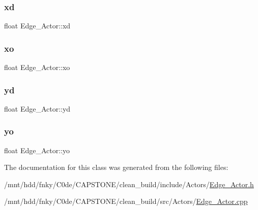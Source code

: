 \mbox{\label{classEdge__Actor_a199cf64246d58f774a44cba9d9beb234}} 
\subsubsection{\texorpdfstring{xd}{xd}}
{\footnotesize\ttfamily float Edge\+\_\+\+Actor\+::xd\hspace{0.3cm}{\ttfamily [private]}}

\mbox{\label{classEdge__Actor_a17823723d52282b169bca1883f19aa99}} 
\subsubsection{\texorpdfstring{xo}{xo}}
{\footnotesize\ttfamily float Edge\+\_\+\+Actor\+::xo\hspace{0.3cm}{\ttfamily [private]}}

\mbox{\label{classEdge__Actor_a0009e7f76e522ae46cc88279f8967205}} 
\subsubsection{\texorpdfstring{yd}{yd}}
{\footnotesize\ttfamily float Edge\+\_\+\+Actor\+::yd\hspace{0.3cm}{\ttfamily [private]}}

\mbox{\label{classEdge__Actor_a74d62448006433516df25448ec8f3cb4}} 
\subsubsection{\texorpdfstring{yo}{yo}}
{\footnotesize\ttfamily float Edge\+\_\+\+Actor\+::yo\hspace{0.3cm}{\ttfamily [private]}}



The documentation for this class was generated from the following files\+:\begin{DoxyCompactItemize}
\item 
/mnt/hdd/fnky/\+C0de/\+C\+A\+P\+S\+T\+O\+N\+E/clean\+\_\+build/include/\+Actors/\hyperlink{Edge__Actor_8h}{Edge\+\_\+\+Actor.\+h}\item 
/mnt/hdd/fnky/\+C0de/\+C\+A\+P\+S\+T\+O\+N\+E/clean\+\_\+build/src/\+Actors/\hyperlink{Edge__Actor_8cpp}{Edge\+\_\+\+Actor.\+cpp}\end{DoxyCompactItemize}
